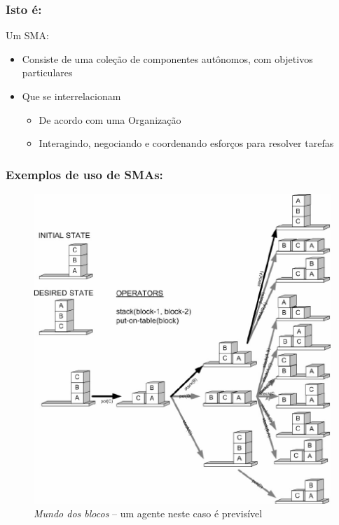 \begin{frame} %

\frametitle{Isto é:}

\begin{block}{Um SMA:}
  \begin{itemize}

   \item Consiste de uma coleção de componentes autônomos, com objetivos particulares
    \item Que se interrelacionam

\begin{itemize}
  \item De acordo com uma Organização
  \item Interagindo, negociando  e coordenando esforços para resolver tarefas 
  \end{itemize}  
  \end{itemize}
   
\end{block}

\end{frame}


\begin{frame} %

  \frametitle{Exemplos de uso de SMAs:}
        
\begin{figure}[!ht]
\centering
\includegraphics[height =.6\textheight,width=.7\textwidth]{figuras/original_example_SMAs01.jpg}
\caption{\textit{Mundo dos blocos} -- um agente neste caso é previsível}
\end{figure}
    
\end{frame}

